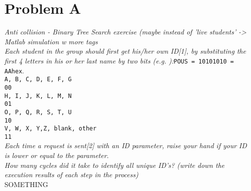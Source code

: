 \section{Problem A}
\textit{Anti collision - Binary Tree Search exercise (maybe instead of 'live students' -> Matlab simulation w more tags}\\

\textit{Each student in the group should first get his/her own ID[1], by substituting the first 4 letters in his or her last name by two bits (e.g. ):}\texttt{POUS = 10101010 = AAhex}.\\

\texttt{A, B, C, D, E, F, G} \\

\texttt{00} \\

\texttt{H, I, J, K, L, M, N }\\

\texttt{01 }\\

\texttt{O, P, Q, R, S, T, U} \\

\texttt{10} \\

\texttt{V, W, X, Y,Z, blank, other} \\

\texttt{11 }\\

\textit{Each time a request is sent[2] with an ID parameter, raise your hand if your ID is lower or equal to the parameter.}\\

\textit{How many cycles did it take to identify all unique ID's? (write down the execution results of each step in the process)}\\

SOMETHING